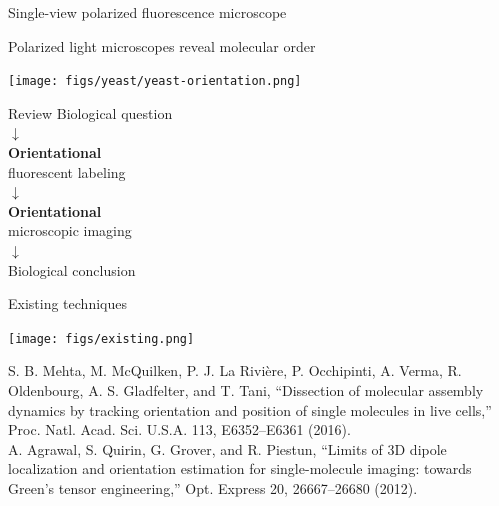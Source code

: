 \documentclass[presentation]{beamer}
\begin{document}
\begin{frame}{Single-view polarized fluorescence microscope}
  \begin{center}
  \end{center}
\end{frame}

\begin{frame}{Polarized light microscopes reveal molecular order}
 \begin{center}
   \texttt{[image: figs/yeast/yeast-orientation.png]}
 \end{center}
\end{frame}

\begin{frame}{Review}
  \centering
  \Large
  Biological question\\ $\downarrow$ \\
  \textbf{Orientational}\\ fluorescent labeling\\ $\downarrow$ \\
  \textbf{Orientational}\\ microscopic imaging \\ $\downarrow$ \\
  Biological conclusion
\end{frame}

\begin{frame}{Existing techniques}
   \begin{center}
     \texttt{[image: figs/existing.png]}\\
   \end{center}
   \tiny
   \vfill
   S. B. Mehta, M. McQuilken, P. J. La Rivi\`{e}re, P. Occhipinti, A. Verma, R.
   Oldenbourg, A. S. Gladfelter, and T. Tani, ``Dissection of molecular assembly
   dynamics by tracking orientation and position of single molecules in live
   cells,'' Proc. Natl. Acad. Sci. U.S.A. 113, E6352–E6361 (2016).\\
   \vspace{0.5em}
   A. Agrawal, S. Quirin, G. Grover, and R. Piestun, ``Limits of 3D dipole
   localization and orientation estimation for single-molecule imaging: towards
   Green’s tensor engineering,'' Opt. Express 20, 26667–26680 (2012).
\end{frame}
\end{document}
